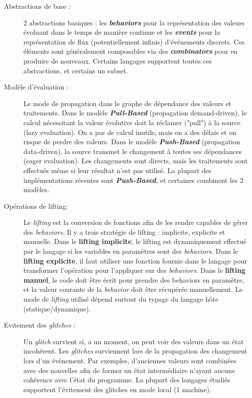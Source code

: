 \documentclass[10pt,final]{IEEEtran}
\begin{document}
\begin{description}
    \item[Abstractions de base :]
    2 abstractions basiques : les \textbf{\textit{behaviors}} pour la représentation des valeurs évoluant dans le temps de manière continue et les \textbf{\textit{events}} pour la représentation de flux (potentiellement infinis) d'événements discrets. Ces éléments sont généralement composables via des \textbf{\textit{combinators}} pour en produire de nouveaux. Certains langages supportent toutes ces abstractions, et certains un subset.
    
    \item[Modèle d'évaluation :]
    Le mode de propagation dans le graphe de dépendance des valeurs et traitements. Dans le modèle \textbf{\textit{Pull-Based}} (propagation demand-driven), le calcul nécessitant la valeur évolutive doit la réclamer ("pull") à la source (lazy evaluation). On a pas de calcul inutile, mais on a des délais et on risque de perdre des valeurs. Dans le modèle \textbf{\textit{Push-Based}} (propagation data-driven), la source transmet le changement à toutes ses dépendances (eager evaluation). Les changements sont directs, mais les traitements sont effectués même si leur résultat n'est pas utilisé. La plupart des implémentations récentes sont \textbf{\textit{Push-Based}}, et certaines combinent les 2 modèles.
    
    \item[Opérations de lifting:]
    Le \textit{lifting} est la conversion de fonctions afin de les rendre capables de gérer des \textit{behaviors}. Il y a trois stratégie de lifting : implicite, explicite et manuelle. Dans le \textbf{lifting implicite}, le lifting est dynamiquement effectué par le langage si les variables en paramètres sont des \textit{behaviors}. Dans le \textbf{lifting explicite}, il faut utiliser une fonction fournie dans le langage pour transformer l'opération pour l'appliquer sur des \textit{behaviors}. Dans le \textbf{lifting manuel}, le code doit être écrit pour prendre des behaviors en paramètre, et la valeur courante de la \textit{behavior} doit être récupérée manuellement. Le mode de \textit{lifting} utilisé dépend surtout du typage du langage hôte (statique/dynamique).
    
    \item[Evitement des \textit{glitches} :]
    Un \textit{glitch} survient si, a un moment, on peut voir des valeurs dans un état incohérent. Les \textit{glitches} surviennent lors de la propagation des changement lors d'un évènement. Par exemples, d'anciennes valeurs sont combinées avec des nouvelles afin de former un état intermédiaire n'ayant aucune cohérence avec l'état du programme. La plupart des langages étudiés supportent l'évitement des glitches en mode local (1 machine).
    

\end{description}
\end{document}
